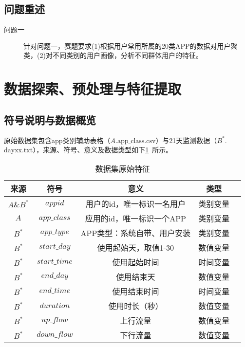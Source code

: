 \documentclass[withoutpreface,bwprint]{cumcmthesis}
\begin{document}
\subsection{问题重述}

\begin{description}
    \item[问题一] 针对问题一，赛题要求(1)根据用户常用所属的20类APP的数据对用户聚类，(2)对不同类别的用户画像，分析不同群体用户的特征。
    \item[]
\end{description}

\newpage
\section{数据探索、预处理与特征提取}

\subsection{符号说明与数据概览}

原始数据集包含app类别辅助表格（$A$.$\text{app\_class.csv}$）与21天监测数据（$B^*$.$\text{dayxx.txt}$），来源、符号、意义及数据类型如下\cref{tab:001}~所示。

\begin{table}[!htbp]
    \caption{数据集原始特征}\label{tab:001} \centering
    \begin{tabular}{ccccc}
        \toprule[1.5pt]
        来源       & 符号            & 意义              & 类型   \\
        \midrule[1pt]
        $A\&B^*$ & $appid$       & 用户的id，唯一标识一名用户  & 类别变量 \\
        $A$      & $app\_class$  & 应用的id，唯一标识一个APP & 类别变量 \\
        $B^*$    & $app\_type$   & APP类型：系统自带、用户安装 & 类别变量 \\
        $B^*$    & $start\_day$  & 使用起始天，取值1-30    & 数值变量 \\
        $B^*$    & $start\_time$ & 使用起始时间          & 时间变量 \\
        $B^*$    & $end\_day$    & 使用结束天           & 数值变量 \\
        $B^*$    & $end\_time$   & 使用结束时间          & 时间变量 \\
        $B^*$    & $duration$    & 使用时长（秒）         & 数值变量 \\
        $B^*$    & $up\_flow$    & 上行流量            & 数值变量 \\
        $B^*$    & $down\_flow$  & 下行流量            & 数值变量 \\
        \bottomrule[1.5pt]
    \end{tabular}
\end{table}
\end{document}
